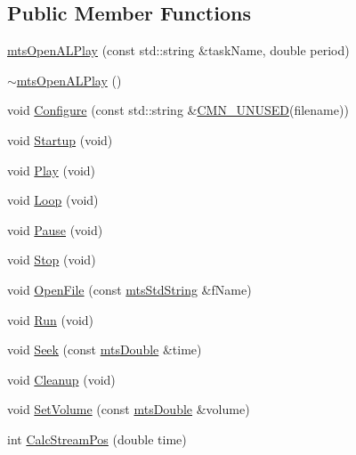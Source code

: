 \subsection*{Public Member Functions}
\begin{DoxyCompactItemize}
\item 
\hyperlink{classmts_open_a_l_play_a8e3527efa2c1a03b3731b021b1014d45}{mts\+Open\+A\+L\+Play} (const std\+::string \&task\+Name, double period)
\item 
\hyperlink{classmts_open_a_l_play_a4cfd60bc8e3b374965a64efe849ea293}{$\sim$mts\+Open\+A\+L\+Play} ()
\item 
void \hyperlink{classmts_open_a_l_play_a50d5e6a0d10ed9ce6731610c8a90348d}{Configure} (const std\+::string \&\hyperlink{cmn_portability_8h_a021894e2626935fa2305434b1e893ff6}{C\+M\+N\+\_\+\+U\+N\+U\+S\+E\+D}(filename))
\item 
void \hyperlink{classmts_open_a_l_play_ad4768ed94873e5be69d2ecaa193d107d}{Startup} (void)
\item 
void \hyperlink{classmts_open_a_l_play_acaaddecf2b42166c43cc70a2dcb30979}{Play} (void)
\item 
void \hyperlink{classmts_open_a_l_play_a636e6ddc634dc16bd49f2eebd992addc}{Loop} (void)
\item 
void \hyperlink{classmts_open_a_l_play_a488f3c12f12b5b0958cde0a881bde27c}{Pause} (void)
\item 
void \hyperlink{classmts_open_a_l_play_a96a4fef394cc593f4bb04a4cfb35fa4a}{Stop} (void)
\item 
void \hyperlink{classmts_open_a_l_play_af255131cd0ce646d98776c1d1d3b9992}{Open\+File} (const \hyperlink{mts_generic_object_proxy_8h_adbc21bfbf98367e582bf8a263b7e711f}{mts\+Std\+String} \&f\+Name)
\item 
void \hyperlink{classmts_open_a_l_play_a2c0ee1fd77ccb0b7e67767aee82cd164}{Run} (void)
\item 
void \hyperlink{classmts_open_a_l_play_ac02d0cc13bd81a096a65e491b1f48b33}{Seek} (const \hyperlink{mts_generic_object_proxy_8h_a31e76b0190a8d3f9838626cd7b47bd75}{mts\+Double} \&time)
\item 
void \hyperlink{classmts_open_a_l_play_abbbe810a394249d4ace57219e477d4d5}{Cleanup} (void)
\item 
void \hyperlink{classmts_open_a_l_play_a04586bb0ae21370a801df27fb318aac6}{Set\+Volume} (const \hyperlink{mts_generic_object_proxy_8h_a31e76b0190a8d3f9838626cd7b47bd75}{mts\+Double} \&volume)
\item 
int \hyperlink{classmts_open_a_l_play_a12253c6e0047c62cbb992f95a4d901d3}{Calc\+Stream\+Pos} (double time)
\end{DoxyCompactItemize}
